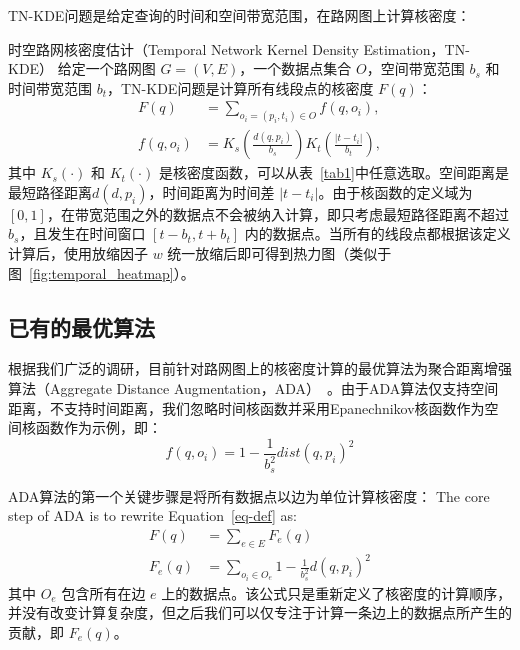 TN-KDE问题是给定查询的时间和空间带宽范围，在路网图上计算核密度：
\begin{definition}{时空路网核密度估计（Temporal Network Kernel Density Estimation，TN-KDE）}
	给定一个路网图 $G=(V, E)$，一个数据点集合 $O$，空间带宽范围 $b_s$ 和时间带宽范围 $b_t$，TN-KDE问题是计算所有线段点的核密度 $F(q)$：
\begin{equation}
\label{eq-def}
\begin{aligned}
	F(q) &= \sum_{o_i=(p_i, t_i) \in O} f(q, o_i), \\
	f(q, o_i) &= 
	K_s\left(\frac{d(q, p_i)}{b_s}\right)
	K_t\left(\frac{\vert t - t_i \vert}{b_t}\right),
\end{aligned}
\end{equation}
其中 $K_s(\cdot)$ 和 $K_t(\cdot)$ 是核密度函数，可以从表~\ref{tab1}中任意选取。空间距离是最短路径距离$d(d, p_i)$，时间距离为时间差 $\vert t - t_i \vert$。由于核函数的定义域为 $[0,1]$，在带宽范围之外的数据点不会被纳入计算，即只考虑最短路径距离不超过 $b_s$，且发生在时间窗口 $[t - b_t, t + b_t]$ 内的数据点。当所有的线段点都根据该定义计算后，使用放缩因子 $w$ 统一放缩后即可得到热力图（类似于图~\ref{fig:temporal_heatmap}）。
\end{definition}





\subsection{已有的最优算法}

根据我们广泛的调研，目前针对路网图上的核密度计算的最优算法为聚合距离增强算法（Aggregate Distance Augmentation，ADA）~\cite{chan_fast_2021}。由于ADA算法仅支持空间距离，不支持时间距离，我们忽略时间核函数并采用Epanechnikov核函数作为空间核函数作为示例，即：
\begin{equation*}
	f(q, o_i) = 1 - \frac{1}{b_s^2} dist(q, p_i)^2
\end{equation*}

ADA算法的第一个关键步骤是将所有数据点以边为单位计算核密度：
The core step of ADA is to rewrite Equation~\ref{eq-def} as:
\begin{equation*}
\label{eq-transform}
\begin{aligned}
	F(q) &= \sum_{e \in E} F_e(q) \\
	F_e(q) &= \sum_{o_i \in O_e} 1 - \frac{1}{b_s^2} d(q, p_i)^2
\end{aligned}
\end{equation*}
其中 $O_e$ 包含所有在边 $e$ 上的数据点。该公式只是重新定义了核密度的计算顺序，并没有改变计算复杂度，但之后我们可以仅专注于计算一条边上的数据点所产生的贡献，即 $F_e(q)$。

